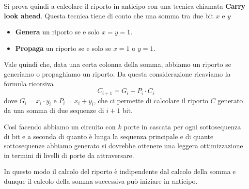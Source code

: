 Si prova quindi a calcolare il riporto in anticipo con una tecnica chiamata
\textbf{Carry look ahead}. Questa tecnica tiene di conto che una somma tra due bit $x$ e $y$
\begin{itemize}
	\item \textbf{Genera} un riporto se e solo $x = y = 1$.
	\item \textbf{Propaga} un riporto se e solo se $x = 1$ o $y = 1$.
\end{itemize}
Vale quindi che, data una certa colonna della somma, abbiamo un riporto se generiamo o propaghiamo
un riporto. Da questa considerazione ricaviamo la formula ricorsiva
\[ C_{i+1} = G_i + P_i \cdot C_i \]
dove $G_i = x_i \cdot y_i$ e $P_i = x_i + y_i$, che ci permette di calcolare il riporto $C$
generato da una somma di due sequenze di $i+1$ bit.

Così facendo abbiamo un circuito con $k$ porte in cascata per ogni sottosequenza di bit e a seconda
di quanto è lunga la sequenza principale e di quante sottosequenze abbiamo generato si dovrebbe
ottenere una leggera ottimizzazione in termini di livelli di porte da attraversare.

In questo modo il calcolo del riporto è indipendente dal calcolo della somma e dunque il calcolo
della somma successiva può iniziare in anticipo.

